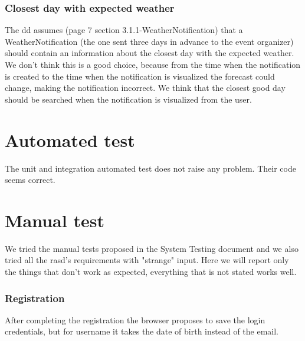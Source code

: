 \documentclass[10pt,a4paper,titlepage]{article}
\begin{document}
\section{Closest day with expected weather}
The dd assumes (page 7 section 3.1.1-WeatherNotification) that a WeatherNotification (the one sent three days in advance to the event organizer) should contain an information about the closest day with the expected weather.
We don't think this is a good choice, because from the time when the notification is created to the time when the notification is visualized the forecast could change, making the notification incorrect. We think that the closest good day should be searched when the notification is visualized from the user.

\pagebreak
\part{Automated test}
The unit and integration automated test does not raise any problem. Their code seems correct.

\part{Manual test}
We tried the manual tests proposed in the System Testing document and we also tried all the rasd's requirements with "strange" input. Here we will report only the things that don't work as expected, everything that is not stated works well.

\section{Registration}
After completing the registration the browser proposes to save the login credentials, but for username it takes the date of birth instead of the email.
\end{document}
